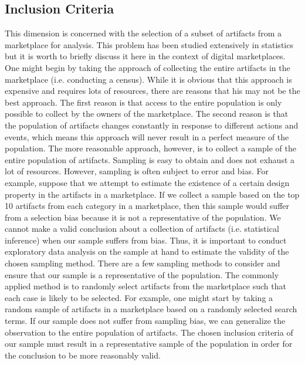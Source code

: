 \subsection{Inclusion Criteria}
This dimension is concerned with the selection of a subset of artifacts from a marketplace for analysis.
This problem has been studied extensively in statistics but it is worth to briefly discuss it here in the context of digital marketplaces.
One might begin by taking the approach of collecting the entire artifacts in the marketplace (i.e. conducting a census).
While it is obvious that this approach is expensive and requires lots of resources, there are reasons that his may not be the best approach.
The first reason is that access to the entire population is only possible to collect by the owners of the marketplace.
The second reason is that the population of artifacts changes constantly in response to different actions and events, which means this approach will never result in a perfect measure of the population.
The more reasonable approach, however, is to collect a sample of the entire population of artifacts.
Sampling is easy to obtain and does not exhaust a lot of resources.
However,  sampling is often subject to error and bias.
For example, suppose that we attempt to estimate the existence of a certain design property in the artifacts in a marketplace.
If we collect a sample based on the top 10 artifacts from each category in a marketplace, then this sample would suffer from a selection bias because it is not a representative of the population.
We cannot make a valid conclusion about a collection of artifacts (i.e. statistical inference) when our sample suffers from bias.
Thus, it is important to conduct exploratory data analysis on the sample at hand to estimate the validity of the chosen sampling method.
There are a few sampling methods to consider and ensure that our sample is a representative of the population.
The commonly applied method is to randomly select artifacts from the marketplace such that each case is likely to be selected.
For example, one might start by taking a random sample of artifacts in a marketplace based on a randomly selected search terms.
If our sample does not suffer from sampling bias, we can generalize the observation to the entire population of artifacts.
The chosen inclusion criteria of our sample must result in a representative sample of the population in order for the conclusion to be more reasonably valid.

